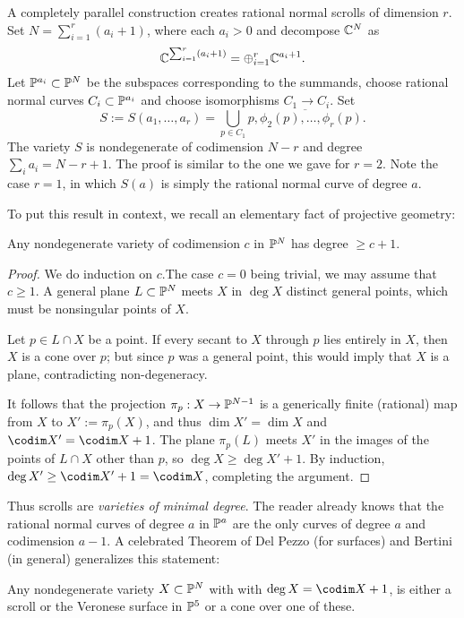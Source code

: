 A completely parallel construction creates rational normal scrolls of dimension $r$. Set $N = \sum_{i=1}^{r}(a_{i}+1)$, where each $a_{i}>0$ and
decompose $\CC^{N}$ as
$$
\CC^{\sum_{i=1}^{r}(a_{i}+1)} = \oplus_{i=1}^{r}\CC^{a_{i}+1}.
$$
Let $\PP^{a_{i}}\subset \PP^{N}$ be the subspaces corresponding to the summands,  choose
rational normal curves $C_{i}\subset \PP^{a_{i}}$ and choose isomorphisms $C_{1}\to C_{i}$. 
Set
$$
S:=S(a_{1}, \dots, a_{r}) = \bigcup_{p\in C_{1}}\overline{p, \phi_{2}(p), \dots, \phi_{r}(p)}.
$$
The variety $S$ is nondegenerate of codimension $N-r$ and degree $\sum_{i}a_{i} = N-r+1$. The proof is similar to the one we gave for $r=2$.
Note the case $r=1$, in which $S(a)$ is simply the rational normal curve of degree $a$. 

To put this result in context, we recall an elementary fact of projective geometry:
 
\begin{proposition}\label{minimal degree}
 Any nondegenerate variety of codimension $c$ in $\PP^{N}$ has degree $\geq c +1$.
\end{proposition}

\begin{proof} We do induction on $c$.The case $c=0$ being trivial,
 we may assume that $c\geq1$. A general plane $L\subset \PP^{N}$ meets $X$ in $\deg X$
 distinct general points, which must be nonsingular points of $X$.
 
Let $p\in L\cap X$ be a point. If every secant to $X$ through $p$ lies entirely in $X$, then $X$ is a cone over $p$; but since $p$ was a general point, this would imply that $X$ is a plane, contradicting non-degeneracy. 

It follows that the projection $\pi_{p}:X \to \PP^{N-1}$ is a generically finite (rational) map from $X$ to $X' := \pi_{p}(X)$,
and thus $\dim X' = \dim X$ and $\codim X' = \codim X+1$. The plane 
$\pi_{p}(L)$ meets $X'$ in the images of the points of $L\cap X$ other than $p$, so
$\deg X\geq \deg X'+1$. By induction, $\deg X' \geq \codim X'+1 = \codim X$, completing the argument.
\end{proof}

Thus scrolls are \emph{varieties of minimal degree}. The reader already knows that the rational normal curves of degree $a$ in $\PP^{a}$ are the only curves of degree $a$ and codimension $a-1$. A celebrated Theorem of Del Pezzo (for surfaces) and Bertini (in general) generalizes this statement:

\begin{theorem}\label{classification of scrolls} 
Any nondegenerate variety $X\subset \PP^{N}$ with with $\deg X = \codim X+1$, is either a scroll or the Veronese surface in $\PP^{5}$ or a cone over one of these.
\end{theorem}

